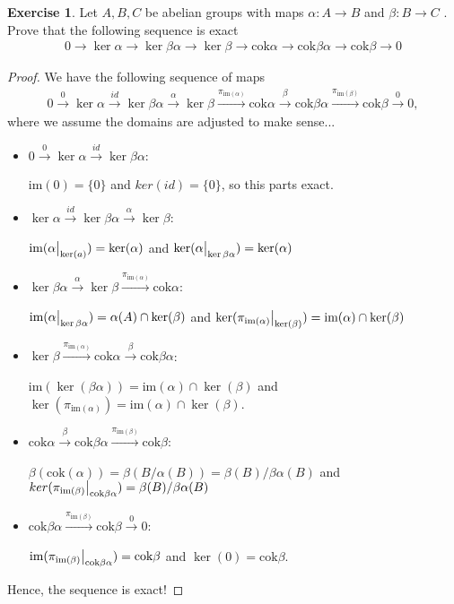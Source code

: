 \documentclass[12pt]{extarticle}
\newcommand{\set}[1]{\{#1\}}
\newcommand\restr[2]{{%
  \left.\kern-\nulldelimiterspace %
  #1 %
  \vphantom{\big|} %
  \right|_{#2} %
  }}
\newcommand{\im}{\text{im}}
\newcommand{\cok}{\text{cok}}
\newcommand{\<}{\langle}
\renewcommand{\>}{\rangle}
\theoremstyle{definition}
\newtheorem{exercise}{Exercise}
\begin{document}
\begin{exercise}
  Let $A,B,C$ be abelian groups with maps $\alpha: A \to B$ and $\beta: B \to C$ . Prove that the following sequence is exact
  \begin{align*}
    0 \to \ker \alpha \to \ker \beta \alpha \to \ker \beta \to \cok \alpha \to \cok  \beta \alpha \to \cok \beta \to 0
  \end{align*}
\end{exercise}
\begin{proof}
  We have the following sequence of maps 
  \begin{align*}
    0 \xrightarrow{0} \ker \alpha \xrightarrow{id}  \ker \beta \alpha \xrightarrow{\alpha} \ker \beta \xrightarrow{\pi_{\im(\alpha)}} \cok \alpha \xrightarrow{\beta} \cok  \beta \alpha \xrightarrow{\pi_{\im(\beta)}} \cok \beta \xrightarrow{0} 0,
  \end{align*}
  where we assume the domains are adjusted to make sense...
  \begin{itemize}
  \item
    $0 \xrightarrow{0} \ker \alpha \xrightarrow{id}  \ker \beta \alpha:$

    $\im(0) = \set{0}$ and $ker(id) = \set{0}$, so this parts exact.
  \item
    $\ker \alpha \xrightarrow{id}  \ker \beta \alpha \xrightarrow{\alpha} \ker \beta$:

    $\im(\restr{\alpha}{\ker(a)}) = \ker(\alpha)$ and $\ker(\restr{\alpha}{\ker \beta \alpha}) = \ker(\alpha)$

  \item
    $\ker \beta \alpha \xrightarrow{\alpha} \ker \beta \xrightarrow{\pi_{\im(\alpha)}} \cok \alpha$:

    $\im(\restr{\alpha}{\ker \beta \alpha}) = \alpha(A) \cap \ker(\beta)$ and $\ker(\restr{\pi_{\im(\alpha)}}{\ker(\beta)}) = \im(\alpha) \cap \ker(\beta)$
  \item
    $\ker \beta \xrightarrow{\pi_{\im(\alpha)}} \cok \alpha \xrightarrow{\beta} \cok  \beta \alpha$:

    $\im(\ker(\beta \alpha)) = \im(\alpha) \cap \ker(\beta)$ and $\ker(\pi_{\im(\alpha)}) = \im(\alpha) \cap \ker(\beta)$.
  \item 
    $\cok \alpha \xrightarrow{\beta} \cok  \beta \alpha \xrightarrow{\pi_{\im(\beta)}} \cok \beta$:

    $\beta(\cok(\alpha)) = \beta(B/\alpha(B)) = \beta(B)/\beta\alpha(B)$ and $ker(\restr{\pi_{\im(\beta)}}{\cok \beta \alpha}) = \beta(B)/\beta\alpha(B)$
  \item
    $\cok  \beta \alpha \xrightarrow{\pi_{\im(\beta)}} \cok \beta \xrightarrow{0} 0$:

    $\im(\restr{\pi_{\im(\beta)}}{\cok \beta \alpha}) = \cok \beta $ and $\ker(0) = \cok \beta$.
  \end{itemize}
  Hence, the sequence is exact! 
\end{proof}
\end{document}
